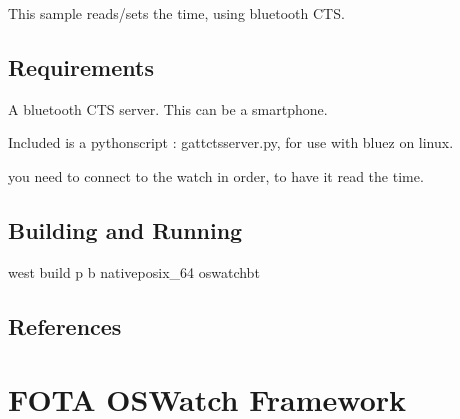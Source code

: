 \documentclass[letterpaper,10pt,english]{sphinxmanual}
\begin{document}
This sample reads/sets the time, using bluetooth CTS.


\subsection{Requirements}
\label{\detokenize{samples/oswatch-ctsREADME:requirements}}
A bluetooth CTS server.
This can be a smartphone.

Included is a python\sphinxhyphen{}script : gatt\sphinxhyphen{}cts\sphinxhyphen{}server.py, for use with bluez on linux.

\begin{sphinxVerbatim}[commandchars=\\\{\}]
 
\end{sphinxVerbatim}

you need to connect to the watch in order, to have it read the time.

\begin{sphinxVerbatim}[commandchars=\\\{\}]
      
      
\end{sphinxVerbatim}


\subsection{Building and Running}
\label{\detokenize{samples/oswatch-ctsREADME:building-and-running}}
west build \sphinxhyphen{}p \sphinxhyphen{}b  native\sphinxhyphen{}posix\_64 oswatch\sphinxhyphen{}bt


\subsection{References}
\label{\detokenize{samples/oswatch-ctsREADME:references}}

\section{FOTA OSWatch Framework}
\label{\detokenize{samples/oswatch-fotaREADME:fota-oswatch-framework}}\label{\detokenize{samples/oswatch-fotaREADME:oswatch}}\label{\detokenize{samples/oswatch-fotaREADME::doc}}
\end{document}
